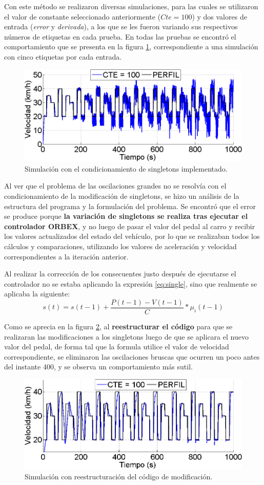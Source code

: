 Con este método se realizaron diversas simulaciones, para las cuales se utilizaron el valor de constante seleccionado anteriormente ($Cte=100$) y dos valores de entrada (\textit{error} y \textit{derivada}), a los que se les fueron variando sus respectivos números de etiquetas en cada prueba. En todas las pruebas se encontró el comportamiento que se presenta en la figura \ref{fig:loco100}, correspondiente a una simulación con cinco etiquetas por cada entrada.

\begin{figure}[htb]
\centering
\includegraphics[width=0.6\linewidth,type=png,ext=.png,read=.png]{figures/loco100}
\caption{Simulación con el condicionamiento de singletons implementado.}
\label{fig:loco100}
\end{figure} 

Al ver que el problema de las oscilaciones grandes no se resolvía con el condicionamiento de la modificación de singletons, se hizo un análisis de la estructura del programa y la formulación del problema. Se encontró que el error se produce porque \textbf{la variación de singletons se realiza tras ejecutar el controlador \gls{ORBEX}}, y no luego de pasar el valor del pedal al carro y recibir los valores actualizados del estado del vehículo, por lo que se realizaban todos los cálculos y comparaciones, utilizando los valores de aceleración y velocidad correspondientes a la iteración anterior.

Al realizar la corrección de los consecuentes justo después de ejecutarse el controlador no se estaba aplicando la expresión \ref{eq:single}, sino que realmente se aplicaba la siguiente:
\[ s(t) = s(t-1) + \frac{P(t-1)-V(t-1)}{C}*\mu_{i}(t-1)\]

Como se aprecia en la figura \ref{fig:buenoCtte100}, al \textbf{reestructurar el código} para que se realizaran las modificaciones a los singletons luego de que se aplicara el nuevo valor del pedal, de forma tal que la formula utilice el valor de velocidad correspondiente, se eliminaron las oscilaciones bruscas que ocurren un poco antes del instante 400, y se observa un comportamiento más sutil.

\begin{figure}[htb]
\centering
\includegraphics[width=0.6\linewidth,type=png,ext=.png,read=.png]{figures/buenoCtte100}
\caption{Simulación con reestructuración del código de modificación.}
\label{fig:buenoCtte100}
\end{figure} 

